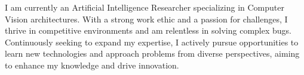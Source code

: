 

\begin{cvparagraph}

I am currently an Artificial Intelligence Researcher specializing in Computer Vision architectures. With a strong work ethic and a passion for challenges, I thrive in competitive environments and am relentless in solving complex bugs. Continuously seeking to expand my expertise, I actively pursue opportunities to learn new technologies and approach problems from diverse perspectives, aiming to enhance my knowledge and drive innovation.

\end{cvparagraph}
